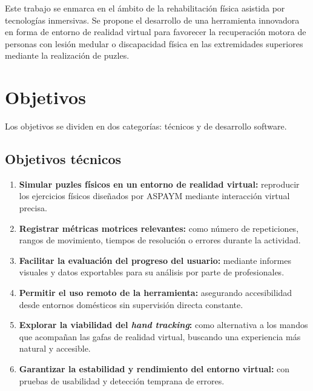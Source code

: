 
Este trabajo se enmarca en el ámbito de la rehabilitación física asistida por tecnologías inmersivas. Se propone el desarrollo de una herramienta innovadora en forma de entorno de realidad virtual para favorecer la recuperación motora de personas con lesión medular o discapacidad física en las extremidades superiores mediante la realización de puzles.

\section{Objetivos}
Los objetivos se dividen en dos categorías: técnicos y de desarrollo software.

\subsection{Objetivos técnicos}
\label{Objetivos técnicos}
\begin{enumerate}
    \item \textbf{Simular puzles físicos en un entorno de realidad virtual:} reproducir los ejercicios físicos diseñados por ASPAYM mediante interacción virtual precisa.
    
    \item \textbf{Registrar métricas motrices relevantes:} como número de repeticiones, rangos de movimiento, tiempos de resolución o errores durante la actividad.
    
    \item \textbf{Facilitar la evaluación del progreso del usuario:} mediante informes visuales y datos exportables para su análisis por parte de profesionales.
    
    \item \textbf{Permitir el uso remoto de la herramienta:} asegurando accesibilidad desde entornos domésticos sin supervisión directa constante.
    
    \item \textbf{Explorar la viabilidad del \textit{hand tracking}:} como alternativa a los mandos que acompañan las gafas de realidad virtual, buscando una experiencia más natural y accesible.
    
    \item \textbf{Garantizar la estabilidad y rendimiento del entorno virtual:} con pruebas de usabilidad y detección temprana de errores.
\end{enumerate}

